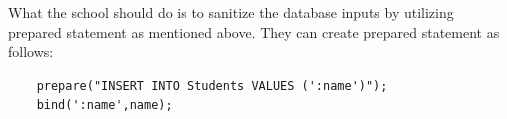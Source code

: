\begin{enumerate}
  What the school should do is to sanitize the database inputs by utilizing prepared statement as mentioned above. They can create prepared statement as follows:
  \begin{lstlisting}
    prepare("INSERT INTO Students VALUES (':name')");
    bind(':name',name);
  \end{lstlisting}

\end{enumerate}
